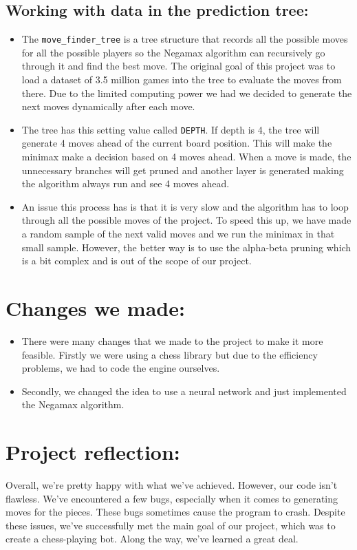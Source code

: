 \documentclass{article}
\begin{document}
\subsection*{Working with data in the prediction tree:}
\begin{itemize}
    \item The \texttt{move\_finder\_tree} is a tree structure that records all the possible moves for all the possible players so the Negamax algorithm can recursively go through it and find the best move. The original goal of this project was to load a dataset of 3.5 million games into the tree to evaluate the moves from there. Due to the limited computing power we had we decided to generate the next moves dynamically after each move.
    \item The tree has this setting value called \texttt{DEPTH}. If depth is 4, the tree will generate 4 moves ahead of the current board position. This will make the minimax make a decision based on 4 moves ahead. When a move is made, the unnecessary branches will get pruned and another layer is generated making the algorithm always run and see 4 moves ahead.
    \item An issue this process has is that it is very slow and the algorithm has to loop through all the possible moves of the project. To speed this up, we have made a random sample of the next valid moves and we run the minimax in that small sample. However, the better way is to use the alpha-beta pruning which is a bit complex and is out of the scope of our project.
\end{itemize}

\section*{Changes we made:}
\begin{itemize}
    \item There were many changes that we made to the project to make it more feasible. Firstly we were using a chess library but due to the efficiency problems, we had to code the engine ourselves.
    \item Secondly, we changed the idea to use a neural network and just implemented the Negamax algorithm.
\end{itemize}

\section*{Project reflection:}
Overall, we're pretty happy with what we've achieved. However, our code isn't flawless. We've encountered a few bugs, especially when it comes to generating moves for the pieces. These bugs sometimes cause the program to crash. Despite these issues, we've successfully met the main goal of our project, which was to create a chess-playing bot. Along the way, we've learned a great deal.
\end{document}
